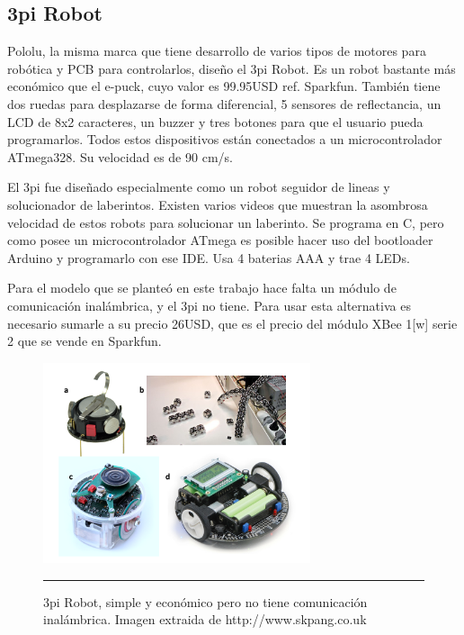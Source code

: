 
\subsection{3pi Robot}

Pololu, la misma marca que tiene desarrollo de varios tipos de motores para robótica y PCB para controlarlos, diseño el 3pi Robot. Es un robot bastante más económico que el e-puck, cuyo valor es 99.95USD ref. Sparkfun. También tiene dos ruedas para desplazarse de forma diferencial, 5 sensores de reflectancia, un LCD de 8x2 caracteres, un buzzer y tres botones para que el usuario pueda programarlos. Todos estos dispositivos están conectados a un microcontrolador ATmega328. Su velocidad es de 90 cm/s.

El 3pi fue diseñado especialmente como un robot seguidor de lineas y solucionador de laberintos. Existen varios videos que muestran la asombrosa velocidad de estos robots para solucionar un laberinto. Se programa en C, pero como posee un microcontrolador ATmega es posible hacer uso del bootloader Arduino y programarlo con ese IDE. Usa 4 baterias AAA y trae 4 LEDs.

Para el modelo que se planteó en este trabajo hace falta un módulo de comunicación inalámbrica, y el 3pi no tiene. Para usar esta alternativa es necesario sumarle a su precio 26USD, que es el precio del módulo XBee 1[w] serie 2 que se vende en Sparkfun.

\begin{figure}[htbp]
	\centering
		\includegraphics[width=0.7\textwidth]{./Figures/robots.png}
		\rule{35em}{0.5pt} 
	\caption[3pi]{3pi Robot, simple y económico pero no tiene comunicación inalámbrica. Imagen extraida de http://www.skpang.co.uk}
	\label{fig:3pi}
\end{figure}


